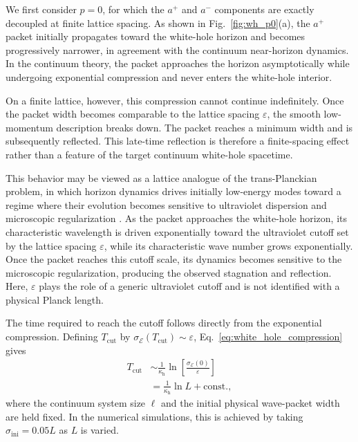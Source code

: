 \documentclass[reprint,amsmath,amssymb,aps,prb,showkeys,superscriptaddress]{revtex4-2}
\begin{document}
We first consider $p=0$, for which the $a^+$ and $a^-$ components
are exactly decoupled at finite lattice spacing. As shown in
Fig.~\ref{fig:wh_p0}(a), the $a^+$ packet initially propagates
toward the white-hole horizon and becomes progressively narrower,
in agreement with the continuum near-horizon dynamics. In the
continuum theory, the packet approaches the horizon asymptotically
while undergoing exponential compression and never enters the
white-hole interior.

On a finite lattice, however, this compression cannot continue
indefinitely. Once the packet width becomes comparable to the
lattice spacing $\varepsilon$, the smooth low-momentum description
breaks down. The packet reaches a minimum width and is subsequently
reflected. This late-time reflection is therefore a finite-spacing
effect rather than a feature of the target continuum white-hole
spacetime.

This behavior may be viewed as a lattice analogue of the
trans-Planckian problem, in which horizon dynamics drives initially
low-energy modes toward a regime where their evolution becomes
sensitive to ultraviolet dispersion and microscopic regularization
\cite{Jacobson1991,Jacobson1993,Unruh1995,
CorleyJacobson1996,Akhmedov2024}. As the packet approaches the white-hole
horizon, its characteristic wavelength is driven exponentially
toward the ultraviolet cutoff set by the lattice spacing
$\varepsilon$, while its characteristic wave number grows
exponentially. Once the packet reaches this cutoff scale, its
dynamics becomes sensitive to the microscopic regularization,
producing the observed stagnation and reflection. Here,
$\varepsilon$ plays the role of a generic ultraviolet cutoff and is
not identified with a physical Planck length.

The time required to reach the cutoff follows directly from the
exponential compression. Defining $T_{\mathrm{cut}}$ by
$\sigma_{\mathcal E}(T_{\mathrm{cut}})\sim\varepsilon$,
Eq.~\eqref{eq:white_hole_compression} gives
\begin{align}
  T_{\mathrm{cut}}
  &\sim
  \frac{1}{\kappa_{\mathrm h}}
  \ln\left[
    \frac{\sigma_{\mathcal E}(0)}{\varepsilon}
  \right]
  \nonumber\\
  &=
  \frac{1}{\kappa_{\mathrm h}}\ln L
  +\mathrm{const.},
  \label{eq:T_logL}
\end{align}
where the continuum system size $\ell$ and the initial physical
wave-packet width are held fixed. In the numerical simulations,
this is achieved by taking
$\sigma_{\mathrm{ini}}=0.05L$ as $L$ is varied.
\end{document}
